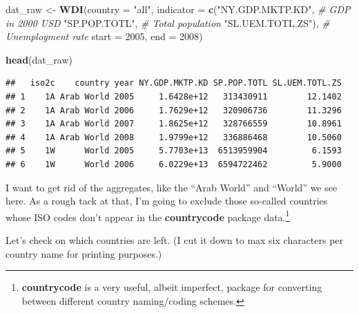 \documentclass[12pt,oneside,openany]{book}
\newenvironment{Shaded}{\begin{snugshade}}{\end{snugshade}}
\newcommand{\KeywordTok}[1]{\textcolor[rgb]{0.13,0.29,0.53}{\textbf{{#1}}}}
\newcommand{\DataTypeTok}[1]{\textcolor[rgb]{0.13,0.29,0.53}{{#1}}}
\newcommand{\DecValTok}[1]{\textcolor[rgb]{0.00,0.00,0.81}{{#1}}}
\newcommand{\StringTok}[1]{\textcolor[rgb]{0.31,0.60,0.02}{{#1}}}
\newcommand{\CommentTok}[1]{\textcolor[rgb]{0.56,0.35,0.01}{\textit{{#1}}}}
\newcommand{\NormalTok}[1]{{#1}}
\let\rmarkdownfootnote\footnote%
\def\footnote{\protect\rmarkdownfootnote}
\begin{document}
\begin{Shaded}
\begin{Highlighting}[]
\NormalTok{dat_raw <-}\StringTok{ }\KeywordTok{WDI}\NormalTok{(}\DataTypeTok{country =} \StringTok{"all"}\NormalTok{,}
               \DataTypeTok{indicator =} \KeywordTok{c}\NormalTok{(}\StringTok{"NY.GDP.MKTP.KD"}\NormalTok{,  }\CommentTok{# GDP in 2000 USD}
                             \StringTok{"SP.POP.TOTL"}\NormalTok{,     }\CommentTok{# Total population}
                             \StringTok{"SL.UEM.TOTL.ZS"}\NormalTok{), }\CommentTok{# Unemployment rate}
               \DataTypeTok{start =} \DecValTok{2005}\NormalTok{,}
               \DataTypeTok{end =} \DecValTok{2008}\NormalTok{)}

\KeywordTok{head}\NormalTok{(dat_raw)}
\end{Highlighting}
\end{Shaded}

\begin{verbatim}
##   iso2c    country year NY.GDP.MKTP.KD SP.POP.TOTL SL.UEM.TOTL.ZS
## 1    1A Arab World 2005     1.6428e+12   313430911        12.1402
## 2    1A Arab World 2006     1.7629e+12   320906736        11.3296
## 3    1A Arab World 2007     1.8625e+12   328766559        10.8961
## 4    1A Arab World 2008     1.9799e+12   336886468        10.5060
## 5    1W      World 2005     5.7703e+13  6513959904         6.1593
## 6    1W      World 2006     6.0229e+13  6594722462         5.9000
\end{verbatim}

I want to get rid of the aggregates, like the ``Arab World'' and
``World'' we see here. As a rough tack at that, I'm going to exclude
those so-called countries whose ISO codes don't appear in the
\textbf{countrycode} package data.\footnote{\textbf{countrycode} is a
  very useful, albeit imperfect, package for converting between
  different country naming/coding schemes.}

\begin{Shaded}
\end{Shaded}

Let's check on which countries are left. (I cut it down to max six
characters per country name for printing purposes.)
\end{document}

